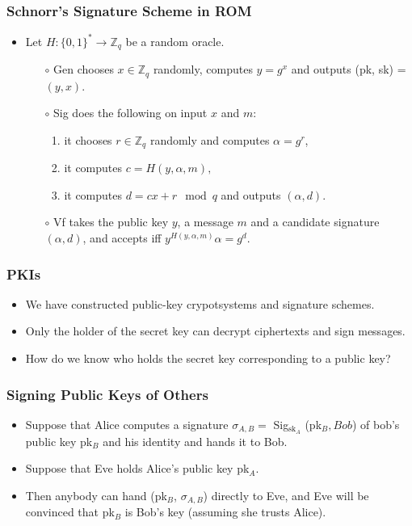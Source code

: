 \documentclass[a4paper]{scrartcl}
\begin{document}
\subsubsection*{Schnorr's Signature Scheme in ROM}

\begin{itemize}
\item Let $H: \{0,1\}^* \rightarrow \mathbb{Z}_q$ be a random oracle.
\begin{itemize}
\item [$\circ$] Gen chooses $x \in \mathbb{Z}_q$ randomly, computes $y = g^x$ and outputs (pk, sk) = $(y,x)$.
\item [$\circ$] Sig does the following on input $x$ and $m$:
\begin{enumerate}
\item it chooses $r \in \mathbb{Z}_q$ randomly and computes $\alpha = g^r$,
\item it computes $c = H(y, \alpha, m),$
\item it computes $d = cx + r \mod q$ and outputs $(\alpha, d)$.
\end{enumerate}
\item [$\circ$] Vf takes the public key $y$, a message $m$ and a candidate signature $(\alpha, d)$, and accepts iff $y^{H(y,\alpha, m)}\alpha = g^d$.
\end{itemize}
\end{itemize}

\subsubsection*{PKIs}

\begin{itemize}
\item We have constructed public-key crypotsystems and signature schemes.
\item Only the holder of the secret key can decrypt ciphertexts and sign messages.
\item How do we know who holds the secret key corresponding to a public key?
\end{itemize}

\subsubsection*{Signing Public Keys of Others}

\begin{itemize}
\item Suppose that Alice computes a signature $\sigma_{A,B} = $ Sig$_{\text{sk}_A}$ (pk$_B, Bob$) of bob's public key pk$_B$ and his identity and hands it to Bob.
\item Suppose that Eve holds Alice's public key pk$_A$.
\item Then anybody can hand (pk$_B$, $\sigma_{A,B}$) directly to Eve, and Eve will be convinced that pk$_B$ is Bob's key (assuming she trusts Alice).
\end{itemize}
\end{document}
